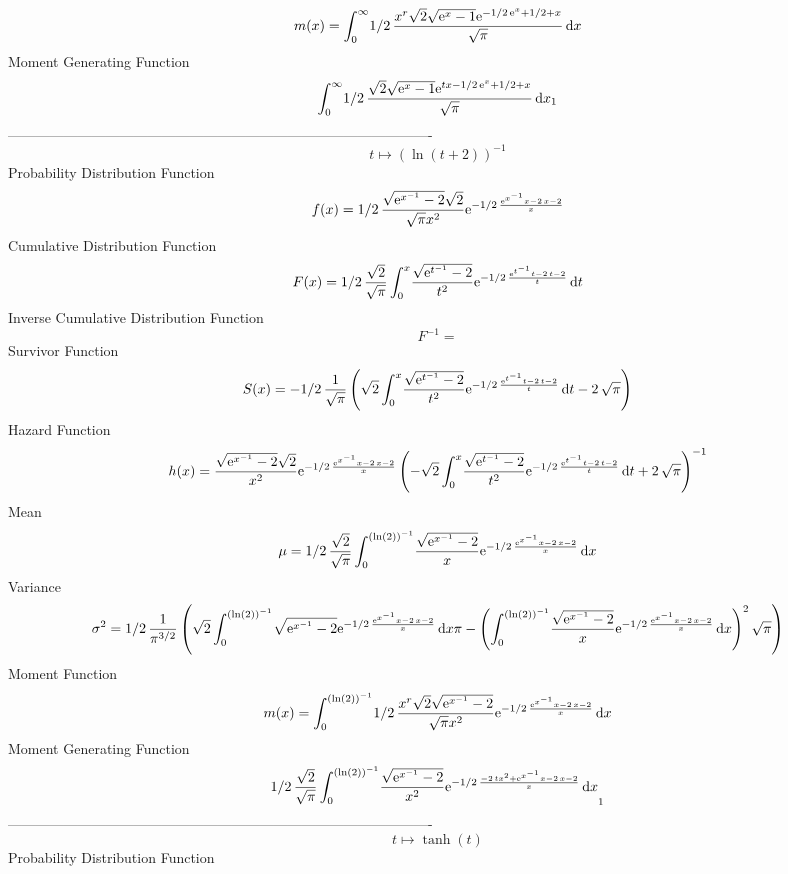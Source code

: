 \documentclass[12pt]{article}
\begin{document}
 $$ m(x) = \int_{0}^{\infty }\!1/2\,{\frac {{x}^{r}\sqrt {2}\sqrt {{{\rm e}^{x}}-
1}{{\rm e}^{-1/2\,{{\rm e}^{x}}+1/2+x}}}{\sqrt {\pi}}}\,{\rm d}x
$$ Moment Generating Function 
 $$\int_{0}^{\infty }\!1/2\,{\frac {\sqrt {2}\sqrt {{{\rm e}^{x}}-1}{
{\rm e}^{tx-1/2\,{{\rm e}^{x}}+1/2+x}}}{\sqrt {\pi}}}\,{\rm d}x_{{1}}
$$-------------------------------------------------------------------------------------------  \\$$t\mapsto  \left( \ln  \left( t+2 \right)  \right) ^{-1}
$$Probability Distribution Function 
$$  f(x)=1/2\,{\frac {\sqrt {{{\rm e}^{{x}^{-1}}}-2}\sqrt {2}}{\sqrt {\pi}{x}^{
2}}{{\rm e}^{-1/2\,{\frac {{{\rm e}^{{x}^{-1}}}x-2\,x-2}{x}}}}}
$$Cumulative Distribution Function  
 $$F(x)=1/2\,{\frac {\sqrt {2}}{\sqrt {\pi}}\int_{0}^{x}\!{\frac {\sqrt {{
{\rm e}^{{t}^{-1}}}-2}}{{t}^{2}}{{\rm e}^{-1/2\,{\frac {{{\rm e}^{{t}^
{-1}}}t-2\,t-2}{t}}}}}\,{\rm d}t}
$$ Inverse Cumulative Distribution Function 
  $$F^{-1} = $$Survivor Function 
 $$ S(x)=-1/2\,{\frac {1}{\sqrt {\pi}} \left( \sqrt {2}\int_{0}^{x}\!{\frac {
\sqrt {{{\rm e}^{{t}^{-1}}}-2}}{{t}^{2}}{{\rm e}^{-1/2\,{\frac {{
{\rm e}^{{t}^{-1}}}t-2\,t-2}{t}}}}}\,{\rm d}t-2\,\sqrt {\pi} \right) }
$$ Hazard Function 
 $$ h(x)={\frac {\sqrt {{{\rm e}^{{x}^{-1}}}-2}\sqrt {2}}{{x}^{2}}{{\rm e}^{-1/
2\,{\frac {{{\rm e}^{{x}^{-1}}}x-2\,x-2}{x}}}} \left( -\sqrt {2}\int_{0
}^{x}\!{\frac {\sqrt {{{\rm e}^{{t}^{-1}}}-2}}{{t}^{2}}{{\rm e}^{-1/2
\,{\frac {{{\rm e}^{{t}^{-1}}}t-2\,t-2}{t}}}}}\,{\rm d}t+2\,\sqrt {\pi
} \right) ^{-1}}
$$Mean 
 $$ \mu=1/2\,{\frac {\sqrt {2}}{\sqrt {\pi}}\int_{0}^{ \left( \ln  \left( 2
 \right)  \right) ^{-1}}\!{\frac {\sqrt {{{\rm e}^{{x}^{-1}}}-2}}{x}{
{\rm e}^{-1/2\,{\frac {{{\rm e}^{{x}^{-1}}}x-2\,x-2}{x}}}}}\,{\rm d}x}
$$ Variance 
 $$ \sigma^2 = 1/2\,{\frac {1}{{\pi}^{3/2}} \left( \sqrt {2}\int_{0}^{ \left( \ln 
 \left( 2 \right)  \right) ^{-1}}\!\sqrt {{{\rm e}^{{x}^{-1}}}-2}{
{\rm e}^{-1/2\,{\frac {{{\rm e}^{{x}^{-1}}}x-2\,x-2}{x}}}}\,{\rm d}x
\pi- \left( \int_{0}^{ \left( \ln  \left( 2 \right)  \right) ^{-1}}\!{
\frac {\sqrt {{{\rm e}^{{x}^{-1}}}-2}}{x}{{\rm e}^{-1/2\,{\frac {{
{\rm e}^{{x}^{-1}}}x-2\,x-2}{x}}}}}\,{\rm d}x \right) ^{2}\sqrt {\pi}
 \right) }
$$Moment Function 
 $$ m(x) = \int_{0}^{ \left( \ln  \left( 2 \right)  \right) ^{-1}}\!1/2\,{\frac {
{x}^{r}\sqrt {2}\sqrt {{{\rm e}^{{x}^{-1}}}-2}}{\sqrt {\pi}{x}^{2}}{
{\rm e}^{-1/2\,{\frac {{{\rm e}^{{x}^{-1}}}x-2\,x-2}{x}}}}}\,{\rm d}x
$$ Moment Generating Function 
 $$1/2\,{\frac {\sqrt {2}}{\sqrt {\pi}}\int_{0}^{ \left( \ln  \left( 2
 \right)  \right) ^{-1}}\!{\frac {\sqrt {{{\rm e}^{{x}^{-1}}}-2}}{{x}^
{2}}{{\rm e}^{-1/2\,{\frac {-2\,t{x}^{2}+{{\rm e}^{{x}^{-1}}}x-2\,x-2
}{x}}}}}\,{\rm d}x}_{{1}}
$$-------------------------------------------------------------------------------------------  \\$$t\mapsto \tanh \left( t \right) 
$$Probability Distribution Function 
\end{document}
